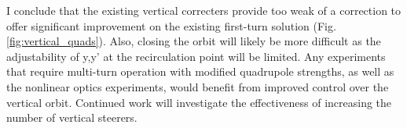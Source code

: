 I conclude that the existing vertical correcters provide too weak of a correction to offer significant improvement on the existing first-turn solution (Fig. \ref{fig:vertical_quads}). Also, closing the orbit will likely be more difficult as the adjustability of y,y' at the recirculation point will be limited. Any experiments that require multi-turn operation with modified quadrupole strengths, as well as the nonlinear optics experiments, would benefit from improved control over the vertical orbit. Continued work will investigate the effectiveness of increasing the number of vertical steerers. 


\begin{figure}[h]
\centering
{}
\hspace{0.5in}
\hspace{0.5in}
\end{figure}





